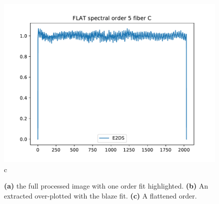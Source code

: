\begin{figure}
\begin{center}
\begin{minipage}{.495\textwidth}
\begin{center}
\includegraphics[width=\textwidth]{Figures/cal_FF_raw_spirou_3.pdf}
c
\end{center}
\end{minipage}%
\end{center}

\caption{\textbf{(a)} the full processed image with one order fit highlighted. \textbf{(b)} An extracted over-plotted with the blaze fit. \textbf{(c)}  A flattened order. \label{figure:cal_FF_raw_spirou}}
\end{figure}